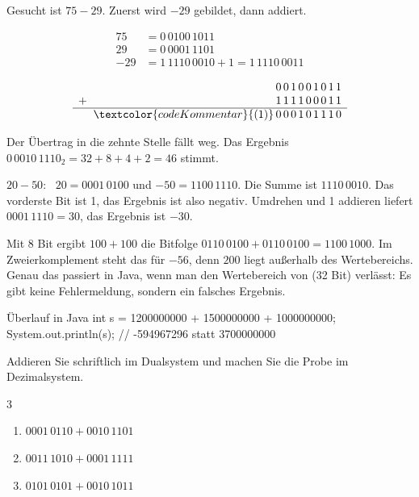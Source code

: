 Gesucht ist $75 - 29$. Zuerst wird $-29$ gebildet, dann addiert.

\noindent\begin{minipage}[c]{0.5\linewidth}
\begin{align*}
75 &= 0\,0100\,1011 \\
29 &= 0\,0001\,1101 \\
-29 &= 1\,1110\,0010 + 1 = 1\,1110\,0011
\end{align*}
\end{minipage}\hfill
\begin{minipage}[c]{0.45\linewidth}
\[
\begin{array}{r@{\;\;}c@{\,}c@{\,}c@{\,}c@{\,}c@{\,}c@{\,}c@{\,}c@{\,}c@{\,}c}
 & & 0 & 0 & 1 & 0 & 0 & 1 & 0 & 1 & 1 \\
+ & & 1 & 1 & 1 & 1 & 0 & 0 & 0 & 1 & 1 \\ \hline
 & \textcolor{codeKommentar}{(1)} & 0 & 0 & 0 & 1 & 0 & 1 & 1 & 1 & 0
\end{array}
\]
\end{minipage}

\smallskip
Der Übertrag in die zehnte Stelle fällt weg. Das Ergebnis $0\,0010\,1110_2 = 32 + 8 + 4 + 2 = 46$ stimmt.

$20 - 50$: \ $20 = 0001\,0100$ und $-50 = 1100\,1110$. Die Summe ist $1110\,0010$. Das vorderste Bit ist 1, das Ergebnis ist also negativ. Umdrehen und 1 addieren liefert $0001\,1110 = 30$, das Ergebnis ist $-30$.

Mit 8 Bit ergibt $100 + 100$ die Bitfolge $0110\,0100 + 0110\,0100 = 1100\,1000$. Im Zweierkomplement steht das für $-56$, denn $200$ liegt außerhalb des Wertebereichs. Genau das passiert in Java, wenn man den Wertebereich von  (32 Bit) verlässt: Es gibt keine Fehlermeldung, sondern ein falsches Ergebnis.
\begin{javacode}[Ausschnitt]{Überlauf in Java}
int s = 1200000000 + 1500000000 + 1000000000;
System.out.println(s);      // -594967296 statt 3700000000
\end{javacode}

\aufgaben
{}
Addieren Sie schriftlich im Dualsystem und machen Sie die Probe im Dezimalsystem.
\begin{multicols}{3}
\begin{enumerate}[label=\alph*)]
\item $0001\,0110 + 0010\,1101$
\item $0011\,1010 + 0001\,1111$
\item $0101\,0101 + 0010\,1011$
\end{enumerate}
\end{multicols}

